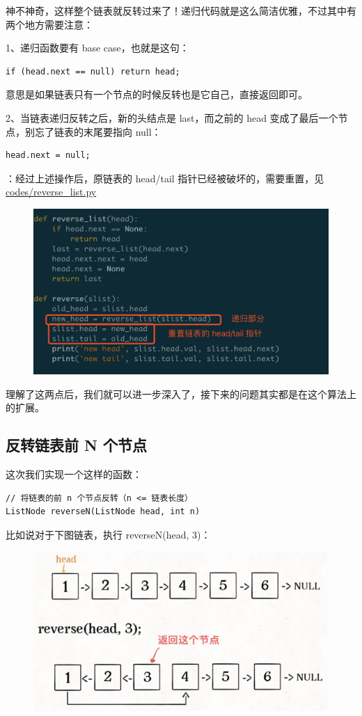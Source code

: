 \documentclass[12pt]{article}
\begin{document}
神不神奇，这样整个链表就反转过来了！递归代码就是这么简洁优雅，不过其中有两个地方需要注意：

1、递归函数要有 base case，也就是这句：
\begin{lstlisting}
if (head.next == null) return head;
\end{lstlisting}
意思是如果链表只有一个节点的时候反转也是它自己，直接返回即可。

2、当链表递归反转之后，新的头结点是 last，而之前的 head 变成了最后一个节点，别忘了链表的末尾要指向 null：
\begin{lstlisting}
head.next = null;
\end{lstlisting}

\begin{framed}
：经过上述操作后，原链表的 head/tail 指针已经被破坏的，需要重置，见 \url{codes/reverse_list.py}
\begin{figure}[H]
    \centering
    \includegraphics[width=.8\textwidth]{fig/Reverse_Single_List_9.png}
\end{figure}
\end{framed}

理解了这两点后，我们就可以进一步深入了，接下来的问题其实都是在这个算法上的扩展。

\subsection{反转链表前 N 个节点}
这次我们实现一个这样的函数：
\begin{lstlisting}
// 将链表的前 n 个节点反转（n <= 链表长度）
ListNode reverseN(ListNode head, int n)
\end{lstlisting}

比如说对于下图链表，执行 reverseN(head, 3)：
\begin{figure}[H]
    \centering
    \includegraphics[width=.5\textwidth]{fig/Reverse_Single_List_7.png}
\end{figure}
\end{document}
